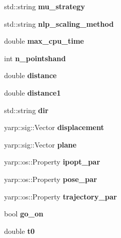 \begin{DoxyCompactItemize}
\item 
std\+::string {\bfseries mu\+\_\+strategy}\label{classGraspComputation_ac45140965ecbdce979e455f3e3de7211}

\item 
std\+::string {\bfseries nlp\+\_\+scaling\+\_\+method}\label{classGraspComputation_a6cf999d26066780519a0f6086b5117aa}

\item 
double {\bfseries max\+\_\+cpu\+\_\+time}\label{classGraspComputation_a8a4ee0afa3541485daa338dd25baaa5c}

\item 
int {\bfseries n\+\_\+pointshand}\label{classGraspComputation_afa3a569ce96b4cb1a13020537646ab5a}

\item 
double {\bfseries distance}\label{classGraspComputation_a0c1bd5e871dfddb9968508fe9bda792c}

\item 
double {\bfseries distance1}\label{classGraspComputation_a268253bf8a04a0b05fcb4b02b4af0fbe}

\item 
std\+::string {\bfseries dir}\label{classGraspComputation_a362c9280e813cfcbb1b0b4153fabc88c}

\item 
yarp\+::sig\+::\+Vector {\bfseries displacement}\label{classGraspComputation_a8cc4909b0e1fa249df366926b91bae74}

\item 
yarp\+::sig\+::\+Vector {\bfseries plane}\label{classGraspComputation_ae2f9c475883f512cb132479ee7896a24}

\item 
yarp\+::os\+::\+Property {\bfseries ipopt\+\_\+par}\label{classGraspComputation_a616f3c17653d2e4d500ce7dbf9849917}

\item 
yarp\+::os\+::\+Property {\bfseries pose\+\_\+par}\label{classGraspComputation_a8903e5f9411e6a064d767b4c75c7f3bd}

\item 
yarp\+::os\+::\+Property {\bfseries trajectory\+\_\+par}\label{classGraspComputation_a72510e6516dab20c66c39e6eae157f3c}

\item 
bool {\bfseries go\+\_\+on}\label{classGraspComputation_a309d4de6f3b04be27ab83e4b32213431}

\item 
double {\bfseries t0}\label{classGraspComputation_a5abf6bd76a8b1a5aee7a49b8ef16a6ac}


\end{DoxyCompactItemize}
